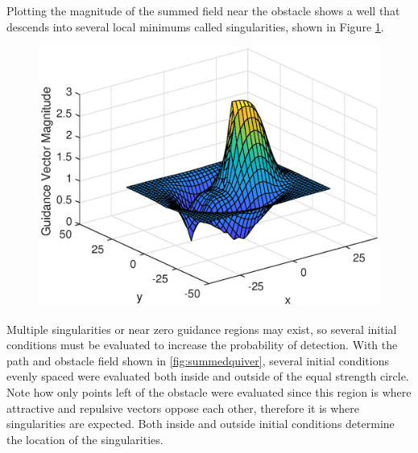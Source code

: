 \documentclass[conf]{new-aiaa}
\begin{document}
Plotting the magnitude of the summed field near the obstacle shows a well that descends into several local minimums called singularities, shown in Figure \ref{fig:summedmagnitudesurf}.


\begin{figure}[H]
	\centering
	\includegraphics[width=0.7\linewidth]{Figures/methods/summedMagnitudeSurf}
	\caption{}
	\label{fig:summedmagnitudesurf}
\end{figure}

 Multiple singularities or near zero guidance regions may exist, so several initial conditions must be evaluated to increase the probability of detection. With the path and obstacle field shown in \ref{fig:summedquiver}, several initial conditions evenly spaced were evaluated both inside and outside of the equal strength circle. Note how only points left of the obstacle were evaluated since this region is where attractive and repulsive vectors oppose each other, therefore it is where singularities are expected. Both inside and outside initial conditions determine the location of the singularities. 
\end{document}
